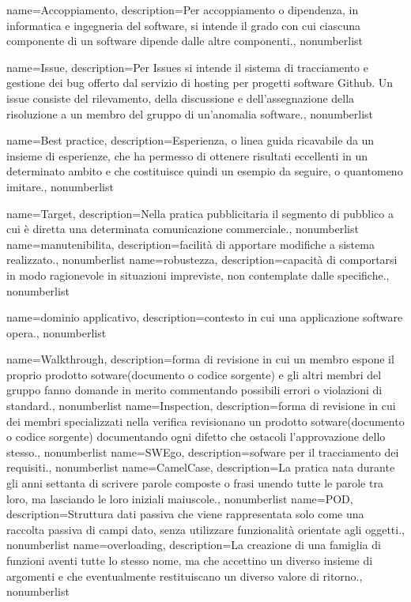 {
	name={Accoppiamento},
	description={Per accoppiamento o dipendenza, in informatica e ingegneria del software, si intende il grado con cui ciascuna componente di un software dipende dalle altre componenti.}, 
	nonumberlist 
}

{
	name={Issue},
	description={Per Issues si intende il sistema di tracciamento e gestione dei bug offerto dal servizio di hosting per progetti software Github. Un issue consiste del rilevamento, della discussione e dell'assegnazione della risoluzione a un membro del gruppo di un'anomalia software.}, 
	nonumberlist 
}

{
	name={Best practice},
	description={Esperienza, o linea guida ricavabile da un insieme di esperienze, che ha permesso di ottenere risultati eccellenti in un determinato ambito e che costituisce quindi un esempio da seguire, o quantomeno imitare.}, 
	nonumberlist 
}

{
	name={Target},
	description={Nella pratica pubblicitaria il segmento di pubblico a cui è diretta una determinata comunicazione commerciale.}, 
	nonumberlist 
}
{
	name={manutenibilita},
	description={facilità di apportare modifiche a sistema realizzato.}, 
	nonumberlist 
}
{
	name={robustezza},
	description={capacità di comportarsi in modo ragionevole in situazioni impreviste, non contemplate dalle specifiche.}, 
	nonumberlist 
}


{
	name={dominio applicativo},
	description={contesto in cui una applicazione software opera.}, 
	nonumberlist 
}

{
	name={Walkthrough},
	description={forma di revisione in cui un membro espone il proprio prodotto sotware(documento o codice sorgente) e gli altri membri del gruppo fanno domande in merito commentando possibili errori o violazioni di standard.}, 
	nonumberlist 
}
{
	name={Inspection},
	description={forma di revisione in cui dei membri specializzati nella verifica revisionano un prodotto sotware(documento o codice sorgente) documentando ogni difetto che ostacoli l'approvazione dello stesso.}, 
	nonumberlist 
}
{
	name={SWEgo},
	description={sofware per il tracciamento dei requisiti.}, 
	nonumberlist 
}
{
name={CamelCase},
description={La pratica nata durante gli anni settanta di scrivere parole composte o frasi unendo tutte le parole tra loro, ma lasciando le loro iniziali maiuscole.}, 
nonumberlist 
}
{
name={POD},
description={Struttura dati passiva che viene rappresentata solo come una raccolta passiva di campi dato, senza utilizzare funzionalità orientate agli oggetti.}, 
nonumberlist 
}
{
name={overloading},
description={La creazione di una famiglia di funzioni aventi tutte lo stesso nome, ma che accettino un diverso insieme di argomenti e che eventualmente restituiscano un diverso valore di ritorno.}, 
nonumberlist 
}